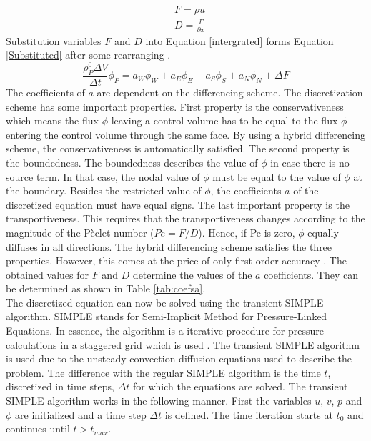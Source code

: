 \documentclass{CFD2017}
\begin{document}
\begin{align}
&F = \rho u\\
&D=\frac{\Gamma}{\partial x}
\end{align}
Substitution variables $F$ and $D$ into Equation \ref{intergrated} forms Equation \ref{Substituted} after some rearranging \cite{Versteeg2007}.
\begin{equation}
\label{Substituted}
\frac{\rho_P^0 \Delta V}{\Delta t}\phi_P=a_W\phi_W+a_E\phi_E+a_S\phi_S+a_N\phi_N +\Delta F
\end{equation}
The coefficients of $a$ are dependent on the differencing scheme. The discretization scheme has some important properties. First property is the conservativeness which means the flux $\phi$ leaving a control volume has to be equal to the flux $\phi$ entering the control volume through the same face. By using a hybrid differencing scheme, the conservativeness is automatically satisfied. The second property is the boundedness. The boundedness describes the value of $\phi$ in case there is no source term. In that case, the nodal value of $\phi$ must be equal to the value of $\phi$ at the boundary. Besides the restricted value of $\phi$, the coefficients $a$ of the discretized equation must have equal signs. The last important property is the transportiveness. This requires that the transportiveness changes according to the magnitude of the P\`{e}clet number ($Pe=F/D$). Hence, if Pe is zero, $\phi$ equally diffuses in all directions. The hybrid differencing scheme satisfies the three properties. However, this comes at the price of only first order accuracy \cite{Versteeg2007}. The obtained values for $F$ and $D$ determine the values of the $a$ coefficients. They can be determined as shown in Table \ref{tab:coefsa}.
\\
The discretized equation can now be solved using the transient SIMPLE algorithm. SIMPLE stands for Semi-Implicit Method for Pressure-Linked Equations. In essence, the algorithm is a iterative procedure for pressure calculations in a staggered grid which is used \cite{Versteeg2007}. The transient SIMPLE algorithm is used due to the unsteady convection-diffusion equations used to describe the problem. The difference with the regular SIMPLE algorithm is the time $t$, discretized in time steps, $\Delta t$ for which the equations are solved. The transient SIMPLE algorithm works in the following manner. First the variables $u$, $v$, $p$ and $\phi$ are initialized and a time step $\Delta t$ is defined. The time iteration starts at $t_0$ and continues until $t>t_{max}$.
\end{document}
